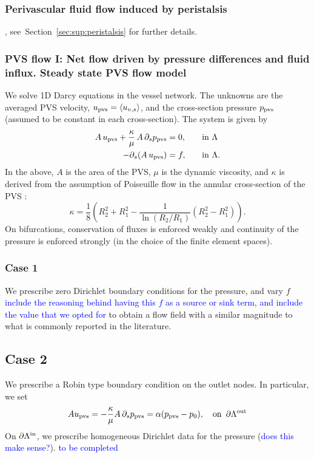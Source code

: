 \documentclass[fleqn,10pt]{wlscirep}
\newcommand{\rami}[1]{\textcolor{blue}{#1}}
\newcommand{\draft}[1]{\textcolor{gray}{#1}}
\begin{document}
\subsubsection*{Perivascular fluid flow induced by peristalsis}

\draft{\lipsum[1]}, see~Section~\ref{sec:sup:peristalsis} for further details.

\subsubsection*{PVS flow I: Net flow driven by pressure differences and fluid influx. Steady state PVS flow model} We solve 1D Darcy equations in the vessel network. The unknowns are the averaged PVS velocity, $u_{\rm pvs} = \langle u_{v,s} \rangle$, and the cross-section pressure $p_{\rm pvs} $ (assumed to be constant in each cross-section). The system is given by  \cite{daversin2022geometrically} 
\begin{alignat}{2}
A \,  u_{\rm pvs}   + \frac{\kappa}{\mu} \, A \, \partial_{s} p_{\rm pvs} & = 0, &&  \quad \rm in  \,\, \Lambda  \\ 
-\partial_s (A \, u_{\rm pvs}) & = f, && \quad \rm in  \,\, \Lambda .  
\end{alignat} 
In the above, $A$ is the area of the PVS, $\mu$ is the dynamic viscosity, and $\kappa$ is derived from the assumption of Poiseuille
flow in the annular cross-section of the PVS \cite{daversin2022geometrically,tithof2022network}: 
\begin{equation}
\kappa = \frac18 \left( R_2^2 + R_1^2 - \frac{1}{\ln(R_2/R_1)} (R_2^2- R_1^2) \right). 
\end{equation}
On bifurcations, conservation of fluxes is enforced weakly and continuity of the pressure is enforced strongly (in the choice of the finite element spaces). 

\subsubsection*{Case 1} We prescribe zero Dirichlet boundary conditions for the pressure, and vary $f$ \rami{include the reasoning behind having this $f$ as a source or sink term, and include the value that we opted for} to obtain a flow field with a similar magnitude to what is commonly reported in the literature.  

\subsection*{Case 2} We prescribe a Robin type boundary condition on the outlet nodes. In particular, we set 
\begin{equation}
A  u_{\rm pvs} =  - \frac{\kappa}{ \mu} A\, \partial_s p_{\rm pvs} = \alpha (p_{\rm pvs} - p_0), \quad  \rm on \,\,\, \partial \Lambda^{\rm out} 
\end{equation}
On $\partial \Lambda^{\rm in}$, we prescribe homogeneous Dirichlet data for the pressure (\rami{does this make sense?}). 
\rami{to be completed }
\end{document}
